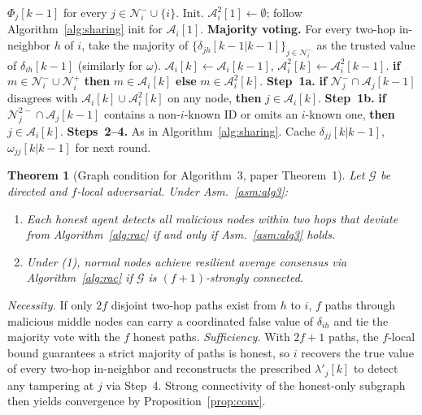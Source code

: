 \documentclass[journal]{IEEEtran}
\newtheorem{theorem}{Theorem}
\newcommand{\NN}{\mathcal{N}}
\newcommand{\AA}{\mathcal{A}}
\newcommand{\MM}{\mathcal{M}}
\newcommand{\GG}{\mathcal{G}}
\begin{document}
\begin{algorithm}[t]
\caption{Fully Distributed Detection (paper Algorithm~3)}
\label{alg:dist}
\begin{algorithmic}[1]
\Require $\Phi_j[k\!-\!1]$ for every $j\in\NN_i^-\cup\{i\}$.
\State Init. $\AA^2_i[1]\leftarrow\emptyset$;
       follow Algorithm~\ref{alg:sharing} init for $\AA_i[1]$.
  \State \textbf{Majority voting.}  For every two-hop in-neighbor $h$ of
         $i$, take the majority of
         $\{\delta_{jh}[k\!-\!1|k\!-\!1]\}_{j\in\NN_i^-}$ as the trusted
         value of $\delta_{ih}[k\!-\!1]$ (similarly for $\omega$).
  \State $\AA_i[k]\leftarrow\AA_i[k\!-\!1]$,
         $\AA^2_i[k]\leftarrow\AA^2_i[k\!-\!1]$.
  \For{$m\in\bigcup_{j\in\NN_i^-}\AA_j[k\!-\!1]$ with $\geq f\!+\!1$ votes}
    \State \textbf{if} $m\in\NN_i^-\cup\NN_i^+$
           \textbf{then} $m\in\AA_i[k]$
    \State \textbf{else} $m\in\AA^2_i[k]$.
  \EndFor
  \For{$j\in\MM_i^-[k]$}
    \State \textbf{Step~1a.} \textbf{if} $\NN_j^-\cap\AA_j[k\!-\!1]$
           disagrees with $\AA_i[k]\cup\AA^2_i[k]$ on any node,
           \textbf{then} $j\in\AA_i[k]$.
    \State \textbf{Step~1b.} \textbf{if} $\NN_j^{2-}\cap\AA_j[k\!-\!1]$
           contains a non-$i$-known ID or omits an $i$-known one,
           \textbf{then} $j\in\AA_i[k]$.
    \State \textbf{Steps~2--4.} As in Algorithm~\ref{alg:sharing}.
  \EndFor
\EndFor
\State Cache $\delta_{jj}[k|k\!-\!1]$, $\omega_{jj}[k|k\!-\!1]$ for next round.
\end{algorithmic}
\end{algorithm}

\begin{theorem}[Graph condition for Algorithm~3, paper Theorem~1]
\label{thm:alg3}
Let $\GG$ be directed and $f$-local adversarial.  Under
Asm.~\ref{asm:alg3}:
\begin{enumerate}
\item Each honest agent detects all malicious nodes within two hops that
deviate from Algorithm~\ref{alg:rac} if and only if Asm.~\ref{asm:alg3}
holds.
\item Under (1), normal nodes achieve resilient average consensus via
Algorithm~\ref{alg:rac} if $\GG$ is $(f\!+\!1)$-strongly connected.
\end{enumerate}
\end{theorem}

\begin{IEEEproof}[Sketch]
\emph{Necessity.}  If only $2f$ disjoint two-hop paths exist from $h$ to $i$,
$f$ paths through malicious middle nodes can carry a coordinated false value
of $\delta_{ih}$ and tie the majority vote with the $f$ honest paths.
\emph{Sufficiency.}  With $2f\!+\!1$ paths, the $f$-local bound guarantees a
strict majority of paths is honest, so $i$ recovers the true value of every
two-hop in-neighbor and reconstructs the prescribed $\lambda'_j[k]$ to
detect any tampering at $j$ via Step~4.  Strong connectivity of the
honest-only subgraph then yields convergence by Proposition~\ref{prop:conv}.
\end{IEEEproof}
\end{document}
